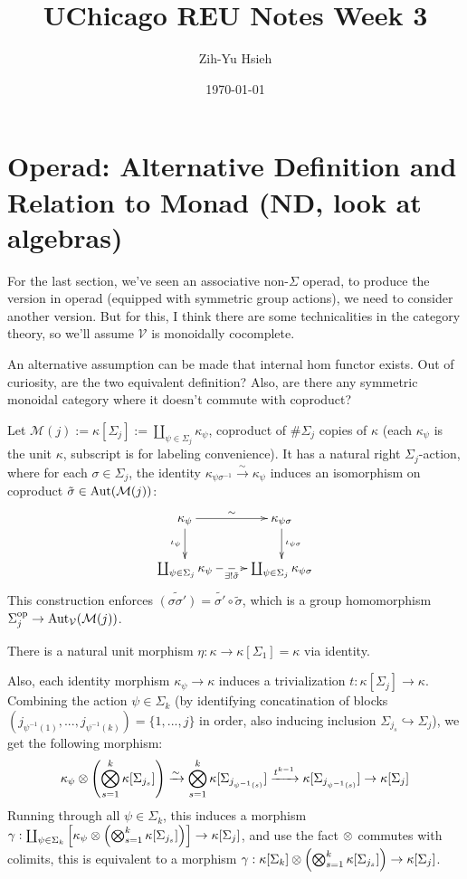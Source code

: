 \documentclass{article}
\title{UChicago REU Notes Week 3}
\author{Zih-Yu Hsieh}
\date{\today}
\begin{document}
\maketitle
\tableofcontents

\section{Operad: Alternative Definition and Relation to Monad (ND, look at algebras)}

For the last section, we've seen an associative non-$\Sigma$ operad, to produce the version in operad (equipped with symmetric group actions), we need to consider another version. But for this, I think there are some technicalities in the category theory, so we'll assume $\mathcal{V}$ is monoidally cocomplete.

An alternative assumption can be made that internal hom functor exists. Out of curiosity, are the two equivalent definition? Also, are there any symmetric monoidal category where it doesn't commute with coproduct?

\begin{exmp}
    Let $\mathcal{M}(j):=\kappa[\Sigma_j]:= \coprod_{\psi\in\Sigma_j}\kappa_\psi$, coproduct of $\#\Sigma_j$ copies of $\kappa$ (each $\kappa_\psi$ is the unit $\kappa$, subscript is for labeling convenience). It has a natural right $\Sigma_j$-action, where for each $\sigma\in\Sigma_j$, the identity $\kappa_{\psi\sigma^{-1}}\xrightarrow{\sim} \kappa_{\psi}$ induces an isomorphism on coproduct $\tilde{\sigma}\in \mathrm{Aut}(\mathcal{M}(j))$:
\[\xymatrix{
    \kappa_{\psi} \ar[d]_-{\iota_{\psi}} \ar[r]^-{\sim} & \kappa_{\psi\sigma} \ar[d]^-{\iota_{\psi\sigma}}\\
    \coprod_{\psi\in\Sigma_j}\kappa_{\psi} \ar@{-->}[r]_-{\exists ! \tilde{\sigma}} & \coprod_{\psi\in\Sigma_j}\kappa_{\psi\sigma} 
}\]
This construction enforces $\tilde{(\sigma\sigma')} = \tilde{\sigma'}\circ \tilde{\sigma}$, which is a group homomorphism $\Sigma_j^{\mathrm{op}}\rightarrow\mathrm{Aut}_\mathcal{V}(\mathcal{M}(j))$.

There is a natural unit morphism $\eta:\kappa\rightarrow \kappa[\Sigma_1] = \kappa$ via identity.

Also, each identity morphism $\kappa_\psi\rightarrow \kappa$ induces a trivialization $t:\kappa[\Sigma_j]\rightarrow\kappa$. Combining the action $\psi\in \Sigma_k$ (by identifying concatination of blocks $(j_{\psi^{-1}(1)},...,j_{\psi^{-1}(k)})=\{1,...,j\}$ in order, also inducing inclusion $\Sigma_{j_s}\hookrightarrow \Sigma_j$), we get the following morphism:
\[\kappa_\psi \otimes \left(\bigotimes_{s=1}^k \kappa[\Sigma_{j_s}]\right)\xrightarrow{\sim} \bigotimes_{s=1}^k \kappa[\Sigma_{j_{\psi^{-1}(s)}}] \xrightarrow{t^{k-1}} \kappa[\Sigma_{j_{\psi^{-1}(s)}}] \rightarrow \kappa[\Sigma_j]\]
Running through all $\psi\in\Sigma_k$, this induces a morphism $\gamma:\coprod_{\psi\in\Sigma_k}\left[\kappa_\psi \otimes \left(\bigotimes_{s=1}^k \kappa[\Sigma_{j_s}]\right)\right] \rightarrow \kappa[\Sigma_j]$, and use the fact $\otimes$ commutes with colimits, this is equivalent to a morphism $\gamma:\kappa[\Sigma_k]\otimes \left(\bigotimes_{s=1}^k \kappa[\Sigma_{j_s}]\right)\rightarrow \kappa[\Sigma_j]$.
\end{exmp}
\end{document}
